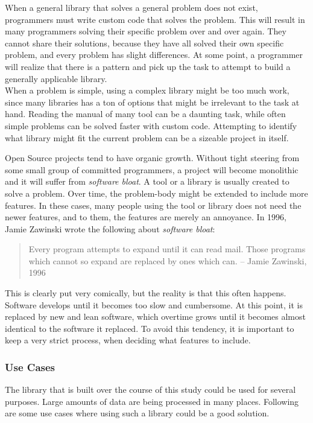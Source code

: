 \documentclass[a4paper]{article}
\begin{document}
When a general library that solves a general problem does not exist, programmers must write custom code that solves the problem. This will result in many programmers solving their specific problem over and over again. They cannot share their solutions, because they have all solved their own specific problem, and every problem has slight differences. At some point, a programmer will realize that there is a pattern and pick up the task to attempt to build a generally applicable library.\\

When a problem is simple, using a complex library might be too much work, since many libraries has a ton of options that might be irrelevant to the task at hand. Reading the manual of many tool can be a daunting task, while often simple problems can be solved faster with custom code. Attempting to identify what library might fit the current problem can be a sizeable project in itself. 

Open Source projects tend to have organic growth. Without tight steering from some small group of committed programmers, a project will become monolithic and it will suffer from \textit{software bloat}. A tool or a library is usually created to solve a problem. Over time, the problem-body might be extended to include more features. In these cases, many people using the tool or library does not need the newer features, and to them, the features are merely an annoyance. In 1996, Jamie Zawinski wrote the following about \textit{software bloat}\cite{bloat}:

\begin{quotation}
  Every program attempts to expand until it can read mail. Those programs which cannot so expand are replaced by ones which can.
  -- Jamie Zawinski, 1996
\end{quotation}

This is clearly put very comically, but the reality is that this often happens. Software develops until it becomes too slow and cumbersome. At this point, it is replaced by new and lean software, which overtime grows until it becomes almost identical to the software it replaced. To avoid this tendency, it is important to keep a very strict process, when deciding what features to include.
    

\subsubsection{Use Cases}
The library that is built over the course of this study could be used for several purposes. Large amounts of data are being processed in many places. Following are some use cases where using such a library could be a good solution.\\
\end{document}

